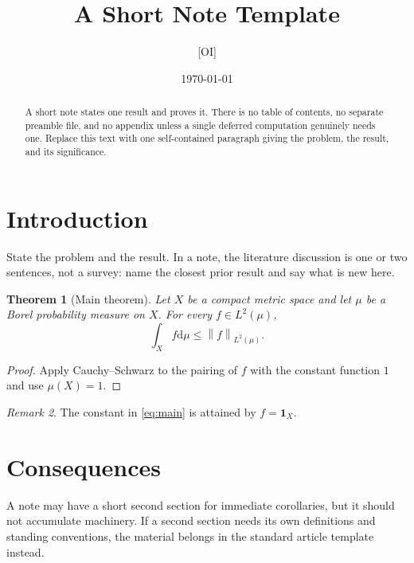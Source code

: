 \documentclass[11pt]{article}
\title{A Short Note Template}
\author{[OI]}
\date{\today}
\numberwithin{equation}{section}
\newtheorem{theorem}{Theorem}[section]
\theoremstyle{definition}
\theoremstyle{remark}
\newtheorem{remark}[theorem]{Remark}
\newcommand{\dd}{\mathrm{d}}
\newcommand{\norm}[1]{\left\lVert #1 \right\rVert}
\begin{document}
\maketitle

\begin{abstract}
A short note states one result and proves it. There is no table of
contents, no separate preamble file, and no appendix unless a single
deferred computation genuinely needs one. Replace this text with one
self-contained paragraph giving the problem, the result, and its
significance.
\end{abstract}

\section{Introduction}
\label{sec:introduction}

State the problem and the result. In a note, the literature discussion
is one or two sentences, not a survey: name the closest prior result
\cite{example-classical} and say what is new here.

\begin{theorem}[Main theorem]
\label{thm:main}
Let $X$ be a compact metric space and let $\mu$ be a Borel probability
measure on $X$. For every $f \in L^2(\mu)$,
\begin{equation}
\label{eq:main}
  \int_X f \dd\mu \le \norm{f}_{L^2(\mu)} .
\end{equation}
\end{theorem}

\begin{proof}
Apply Cauchy--Schwarz to the pairing of $f$ with the constant function
$1$ and use $\mu(X) = 1$.
\end{proof}

\begin{remark}
\label{rem:sharp}
The constant in \cref{eq:main} is attained by $f = \mathbf{1}_X$.
\end{remark}

\section{Consequences}
\label{sec:consequences}

A note may have a short second section for immediate corollaries, but
it should not accumulate machinery. If a second section needs its own
definitions and standing conventions, the material belongs in the
standard article template instead.



\end{document}
